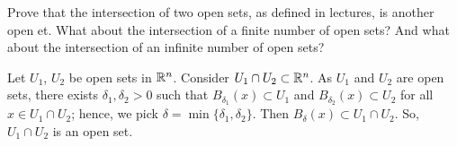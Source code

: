 
\setcounter{question}{42}
\question Prove that the intersection of two open sets, as defined in lectures, is another open et.
What about the intersection of a finite number of open sets?
And what about the intersection of an infinite number of open sets?
\begin{solution}
    Let $U_1$, $U_2$ be open sets in $\mathbb{R}^n$.
    Consider $U_1 \cap U_2 \subset \mathbb{R}^n$.
    As $U_1$ and $U_2$ are open sets, there exists $\delta_1, \delta_2 > 0$ such that $B_{\delta_1}(x) \subset U_1$ and $B_{\delta_2} (x) \subset U_2$ for all $x \in U_1 \cap U_2$;
    hence, we pick $\delta = \min\{\delta_1, \delta_2\}$.
    Then $B_{\delta}(x) \subset U_1 \cap U_2$.
    So, $U_1 \cap U_2$ is an open set.
\end{solution}

